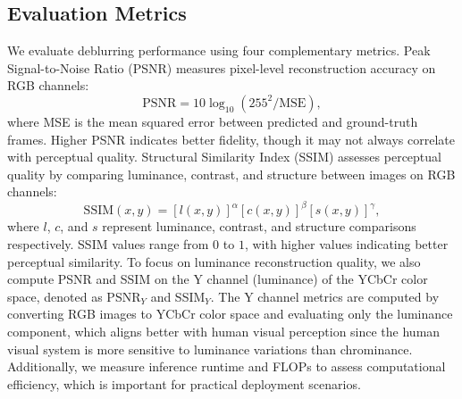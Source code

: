 \documentclass[conference]{IEEEtran}
\begin{document}
\subsection{Evaluation Metrics}
We evaluate deblurring performance using four complementary metrics. Peak Signal-to-Noise Ratio (PSNR) measures pixel-level reconstruction accuracy on RGB channels: 
\begin{equation}
\text{PSNR} = 10 \log_{10}(255^2 / \text{MSE}),
\end{equation}
where MSE is the mean squared error between predicted and ground-truth frames. Higher PSNR indicates better fidelity, though it may not always correlate with perceptual quality. Structural Similarity Index (SSIM) \cite{wang_image_2004} assesses perceptual quality by comparing luminance, contrast, and structure between images on RGB channels: 
\begin{equation}
\text{SSIM}(x,y) = [l(x,y)]^\alpha [c(x,y)]^\beta [s(x,y)]^\gamma,
\end{equation}
where $l$, $c$, and $s$ represent luminance, contrast, and structure comparisons respectively. SSIM values range from $0$ to $1$, with higher values indicating better perceptual similarity. To focus on luminance reconstruction quality, we also compute PSNR and SSIM on the Y channel (luminance) of the YCbCr color space, denoted as PSNR$_Y$ and SSIM$_Y$. The Y channel metrics are computed by converting RGB images to YCbCr color space and evaluating only the luminance component, which aligns better with human visual perception since the human visual system is more sensitive to luminance variations than chrominance. Additionally, we measure inference runtime and FLOPs to assess computational efficiency, which is important for practical deployment scenarios.
\end{document}
